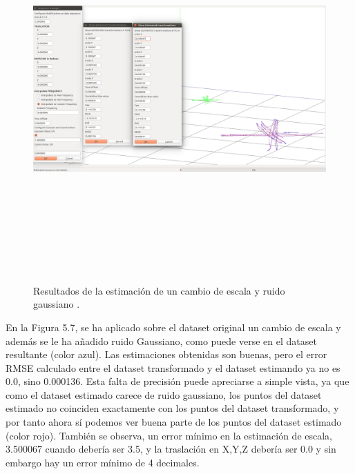 \begin{figure}[H]
\begin{center}
\label{fig:opciones de View}\includegraphics[height=14.0cm,width=18.0cm]{img/cap6/Escala_GaussNoise_abba.png}
\hspace{0.5cm}

\end{center}

\caption{Resultados de la estimación de un cambio de escala y ruido gaussiano .}
\end{figure}

En la Figura 5.7, se ha aplicado sobre el dataset original un cambio de escala y además se le ha añadido ruido Gaussiano, como puede verse en el dataset resultante (color azul). Las estimaciones obtenidas son buenas, pero el error RMSE calculado entre el dataset transformado y el dataset estimando ya no es 0.0, sino 0.000136. Esta falta de precisión puede apreciarse a simple vista, ya que como el dataset estimado carece de ruido gaussiano, los puntos del dataset estimado no coinciden exactamente con los puntos del dataset transformado, y por tanto ahora sí podemos ver buena parte de los puntos del dataset estimado (color rojo).
También se observa, un error mínimo en la estimación de escala, 3.500067 cuando debería ser 3.5, y la traslación en X,Y,Z debería ser 0.0 y sin embargo hay un error mínimo de 4 decimales.


